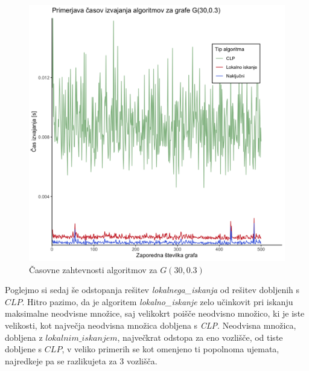 \documentclass[a4paper, 12pt]{article}
\begin{document}
\begin{figure}[h!]
	\begin{center}
		\includegraphics[scale=0.11]{R_koda/pon-casi.png}
		\caption{Časovne zahtevnosti algoritmov za $G(30, 0.3)$}
	\end{center}
\end{figure}

\noindent Poglejmo si sedaj še odstopanja rešitev \textit{lokalnega\_iskanja} od rešitev dobljenih s $CLP$. Hitro pazimo, da je algoritem \textit{lokalno\_iskanje} zelo učinkovit pri iskanju maksimalne neodvisne množice, saj velikokrt 
poišče neodvisno množico, ki je iste velikosti, kot največja neodvisna množica dobljena s \textit{CLP}. Neodvisna množica, dobljena z  $lokalnim\_iskanjem$, največkrat odstopa za eno vozlišče, od tiste dobljene s $CLP$, 
v veliko primerih se kot omenjeno ti popolnoma ujemata, najredkeje pa se razlikujeta za 3 vozlišča.
\end{document}
